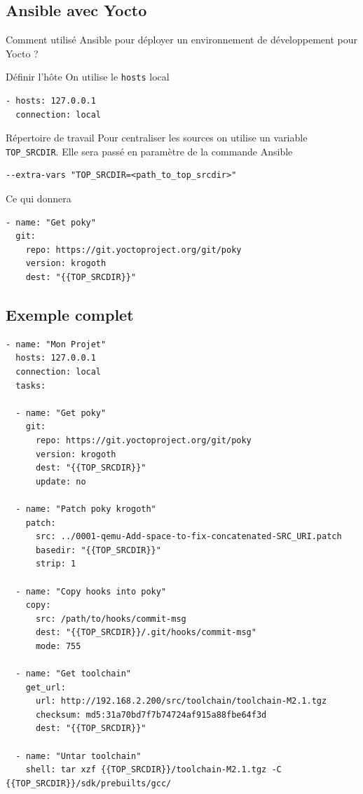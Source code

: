 \documentclass[compress]{smilebeamer}
\begin{document}
\subsection{Ansible avec Yocto}

\begin{frame}
\begin{center}
\huge{Comment utilisé Ansible pour déployer un environnement de développement pour Yocto ?}
\end{center}
\end{frame}

\begin{frame}[fragile]{Définir l'hôte}
On utilise le \texttt{hosts} local
\begin{lstlisting}[style=bitbake]
- hosts: 127.0.0.1
  connection: local
\end{lstlisting}
\end{frame}

\begin{frame}[fragile]{Répertoire de travail}
Pour centraliser les sources on utilise un variable \texttt{TOP\_SRCDIR}.\newline
Elle sera passé en paramètre de la commande Ansible
\begin{lstlisting}[style=shell]
--extra-vars "TOP_SRCDIR=<path_to_top_srcdir>"
\end{lstlisting}
Ce qui donnera
\begin{lstlisting}[style=bitbake]
- name: "Get poky"
  git:
    repo: https://git.yoctoproject.org/git/poky
    version: krogoth
    dest: "{{TOP_SRCDIR}}"
\end{lstlisting}
\end{frame}

\subsection{Exemple complet}
\begin{frame}[fragile]
\begin{lstlisting}[style=bitbake,basicstyle=\tiny\ttfamily\color{white}]
- name: "Mon Projet"
  hosts: 127.0.0.1
  connection: local
  tasks:

  - name: "Get poky"
    git:
      repo: https://git.yoctoproject.org/git/poky
      version: krogoth
      dest: "{{TOP_SRCDIR}}"
      update: no

  - name: "Patch poky krogoth"
    patch:
      src: ../0001-qemu-Add-space-to-fix-concatenated-SRC_URI.patch
      basedir: "{{TOP_SRCDIR}}"
      strip: 1

  - name: "Copy hooks into poky"
    copy:
      src: /path/to/hooks/commit-msg
      dest: "{{TOP_SRCDIR}}/.git/hooks/commit-msg"
      mode: 755

  - name: "Get toolchain"
    get_url:
      url: http://192.168.2.200/src/toolchain/toolchain-M2.1.tgz
      checksum: md5:31a70bd7f7b74724af915a88fbe64f3d
      dest: "{{TOP_SRCDIR}}"

  - name: "Untar toolchain"
    shell: tar xzf {{TOP_SRCDIR}}/toolchain-M2.1.tgz -C {{TOP_SRCDIR}}/sdk/prebuilts/gcc/
\end{lstlisting}
\end{frame}
\end{document}
